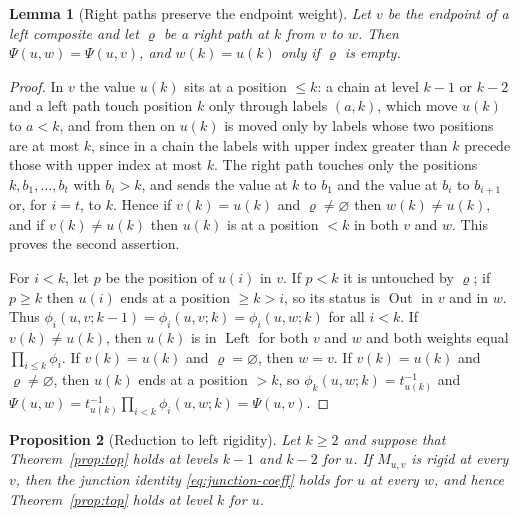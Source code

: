 \documentclass[11pt]{article}
\newtheorem{proposition}{Proposition}
\newtheorem{lemma}[proposition]{Lemma}
\newcommand{\Left}{\operatorname{Left}}
\newcommand{\Out}{\operatorname{Out}}
\begin{document}
\begin{lemma}[Right paths preserve the endpoint weight]
\label{lem:right-paths}
Let $v$ be the endpoint of a left composite and let $\varrho$ be a
right path at $k$ from $v$ to $w$. Then $\Psi(u,w)=\Psi(u,v)$, and
$w(k)=u(k)$ only if $\varrho$ is empty.
\end{lemma}

\begin{proof}
In $v$ the value $u(k)$ sits at a position $\leq k$: a chain at level
$k-1$ or $k-2$ and a left path touch position $k$ only through labels
$(a,k)$, which move $u(k)$ to $a<k$, and from then on $u(k)$ is moved
only by labels whose two positions are at most $k$, since in a chain
the labels with upper index greater than $k$ precede those with upper
index at most $k$. The right path touches only the positions
$k,b_1,\ldots,b_t$ with $b_i>k$, and sends the value at $k$ to $b_1$
and the value at $b_i$ to $b_{i+1}$ or, for $i=t$, to $k$. Hence if
$v(k)=u(k)$ and $\varrho\neq\varnothing$ then $w(k)\neq u(k)$, and if
$v(k)\neq u(k)$ then $u(k)$ is at a position $<k$ in both $v$ and $w$.
This proves the second assertion.

For $i<k$, let $p$ be the position of $u(i)$ in $v$. If $p<k$ it is
untouched by $\varrho$; if $p\geq k$ then $u(i)$ ends at a position
$\geq k>i$, so its status is $\Out$ in $v$ and in $w$. Thus
$\phi_i(u,v;k-1)=\phi_i(u,v;k)=\phi_i(u,w;k)$ for all $i<k$. If
$v(k)\neq u(k)$, then $u(k)$ is in $\Left$ for both $v$ and $w$ and
both weights equal $\prod_{i\leq k}\phi_i$. If $v(k)=u(k)$ and
$\varrho=\varnothing$, then $w=v$. If $v(k)=u(k)$ and
$\varrho\neq\varnothing$, then $u(k)$ ends at a position $>k$, so
$\phi_k(u,w;k)=t^{-1}_{u(k)}$ and
$\Psi(u,w)=t^{-1}_{u(k)}\prod_{i<k}\phi_i(u,w;k)=\Psi(u,v)$.
\end{proof}

\begin{proposition}[Reduction to left rigidity]\label{prop:left-rigidity}
Let $k\geq2$ and suppose that Theorem~\ref{prop:top} holds at levels
$k-1$ and $k-2$ for $u$. If $M_{u,v}$ is rigid at every $v$, then the
junction identity \eqref{eq:junction-coeff} holds for $u$ at every
$w$, and hence Theorem~\ref{prop:top} holds at level $k$ for $u$.
\end{proposition}
\end{document}
